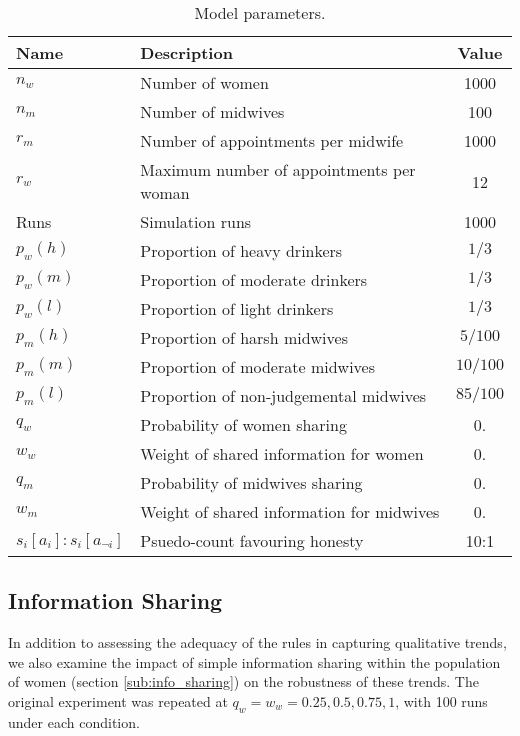 \begin{table}[h!]
\center
\begin{tabular} {|l | l | c|}
\hline
Name & Description & Value \\ \hline
\(n_{w}\) & Number of women & 1000 \\ \hline
\(n_{m}\) & Number of midwives & 100 \\ \hline
\(r_{m}\) & Number of appointments per midwife & 1000 \\ \hline
\(r_{w}\) & Maximum number of appointments per woman & 12 \\ \hline
Runs & Simulation runs & 1000 \\ \hline
\(p_{w}(h)\) & Proportion of heavy drinkers & \(1/3\) \\ \hline
\(p_{w}(m)\) & Proportion of moderate drinkers & \(1/3\) \\ \hline
\(p_{w}(l)\) & Proportion of light drinkers & \(1/3\) \\ \hline
\(p_{m}(h)\) & Proportion of harsh midwives & \(5/100\) \\ \hline
\(p_{m}(m)\) & Proportion of moderate midwives & \(10/100\) \\ \hline
\(p_{m}(l)\) & Proportion of non-judgemental midwives & \(85/100\) \\ \hline
\(q_{w}\) & Probability of women sharing & 0. \\ \hline
\(w_{w}\) & Weight of shared information for women & 0. \\ \hline
\(q_{m}\) & Probability of midwives sharing & 0. \\ \hline
\(w_{m}\) & Weight of shared information for midwives & 0. \\ \hline
\(s_{i}[a_{i}]:s_{i}[a_{\neg i}]\) & Psuedo-count favouring honesty & 10:1 \\ \hline
\end{tabular}
\caption[Table caption text]{Model parameters. \label{tab:qt_params}}
\end{table}

\subsection{Information Sharing}

In addition to assessing the adequacy of the rules in capturing qualitative trends, we also examine the impact of simple information sharing within the population of women (section \ref{sub:info_sharing}) on the robustness of these trends. The original experiment was repeated at \(q_{w}=w_{w}={0.25, 0.5, 0.75, 1}\), with 100 runs under each condition. 

